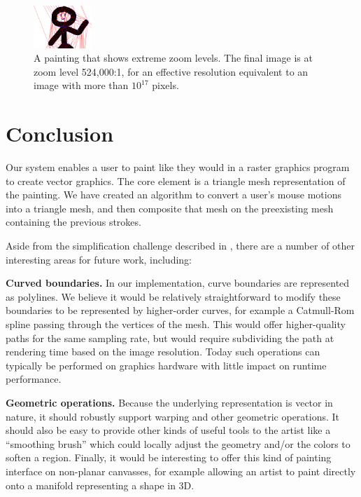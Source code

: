 \documentclass[review,draft]{acmsiggraph}
\begin{document}
\begin{figure}
        \includegraphics[width=0.195\textwidth]{images/zoom72}
    \caption{A painting that shows extreme zoom levels.  The final image is at zoom level 524,000:1, for an effective resolution equivalent to an image with more than $10^{17}$ pixels.}
    \label{fig:boxes}
\end{figure}

\section{Conclusion}
Our system enables a user to paint like they would in a raster graphics program 
to create vector graphics. The core element is a triangle mesh representation of the painting.
We have created an algorithm to convert a user's mouse motions into a triangle mesh, and then composite that mesh on the preexisting mesh containing the previous strokes.

Aside from the simplification challenge described in , there are a number of other interesting areas for future work, including:

\noindent
{\bf Curved boundaries.}
In our implementation, curve boundaries are represented as polylines. We believe it would be relatively straightforward to modify these boundaries to be represented by higher-order curves, 
for example a Catmull-Rom spline passing through the vertices of the mesh. This would offer
higher-quality paths for the same sampling rate, but would require subdividing the path at
rendering time based on the image resolution. Today such operations can typically be 
performed on graphics hardware with little impact on runtime performance.

\noindent
{\bf Geometric operations.}
Because the underlying representation is vector in nature, it should robustly support warping and
other geometric operations. It should also be easy to provide other kinds of useful tools to the 
artist like a ``smoothing brush'' which could locally adjust the geometry and/or the colors to soften a region. Finally, it would be interesting to offer this kind of painting interface on non-planar canvasses, for example allowing an artist to paint directly onto a manifold representing a shape in 3D.




\end{document}
